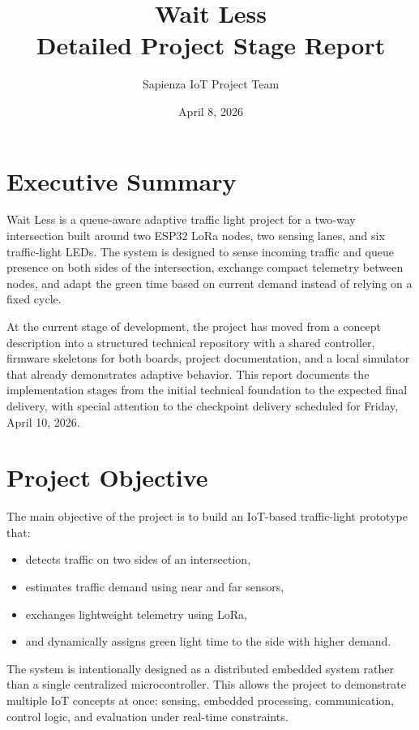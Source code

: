 \documentclass[11pt,a4paper]{article}
\title{Wait Less\\Detailed Project Stage Report}
\author{Sapienza IoT Project Team}
\date{April 8, 2026}
\begin{document}
\maketitle
\tableofcontents
\newpage

\section{Executive Summary}

Wait Less is a queue-aware adaptive traffic light project for a two-way intersection built around two ESP32 LoRa nodes, two sensing lanes, and six traffic-light LEDs. The system is designed to sense incoming traffic and queue presence on both sides of the intersection, exchange compact telemetry between nodes, and adapt the green time based on current demand instead of relying on a fixed cycle.

At the current stage of development, the project has moved from a concept description into a structured technical repository with a shared controller, firmware skeletons for both boards, project documentation, and a local simulator that already demonstrates adaptive behavior. This report documents the implementation stages from the initial technical foundation to the expected final delivery, with special attention to the checkpoint delivery scheduled for Friday, April 10, 2026.

\section{Project Objective}

The main objective of the project is to build an IoT-based traffic-light prototype that:

\begin{itemize}
    \item detects traffic on two sides of an intersection,
    \item estimates traffic demand using near and far sensors,
    \item exchanges lightweight telemetry using LoRa,
    \item and dynamically assigns green light time to the side with higher demand.
\end{itemize}

The system is intentionally designed as a distributed embedded system rather than a single centralized microcontroller. This allows the project to demonstrate multiple IoT concepts at once: sensing, embedded processing, communication, control logic, and evaluation under real-time constraints.
\end{document}
